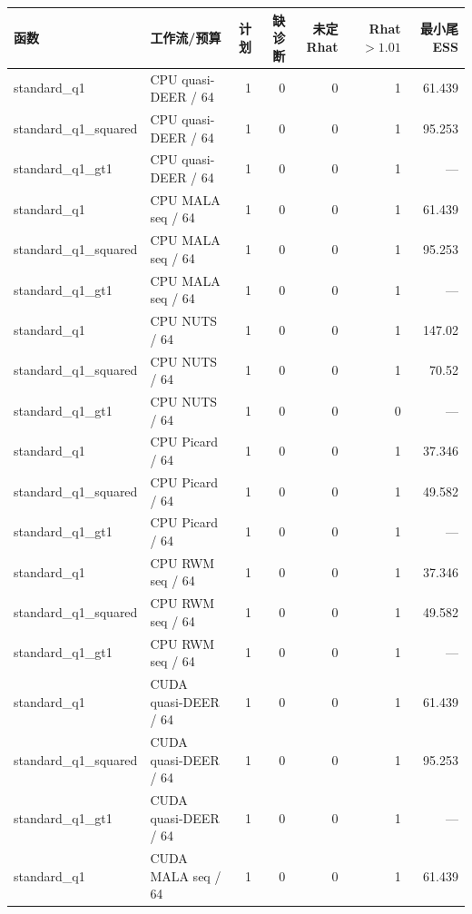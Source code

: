 \documentclass[UTF8,fontset=fandol,a4paper]{ctexart}
\begin{document}
\begingroup\footnotesize\begin{longtable}{P{28mm}P{40mm}rrrrr}
\toprule 函数 & 工作流/预算 & 计划 & 缺诊断 & 未定Rhat & Rhat$>1.01$ & 最小尾ESS \\ \midrule\endhead
standard\_\allowbreak{}q1 & CPU quasi-DEER / 64 & 1 & 0 & 0 & 1 & 61.439 \\
standard\_\allowbreak{}q1\_\allowbreak{}squared & CPU quasi-DEER / 64 & 1 & 0 & 0 & 1 & 95.253 \\
standard\_\allowbreak{}q1\_\allowbreak{}gt1 & CPU quasi-DEER / 64 & 1 & 0 & 0 & 1 & — \\
standard\_\allowbreak{}q1 & CPU MALA seq / 64 & 1 & 0 & 0 & 1 & 61.439 \\
standard\_\allowbreak{}q1\_\allowbreak{}squared & CPU MALA seq / 64 & 1 & 0 & 0 & 1 & 95.253 \\
standard\_\allowbreak{}q1\_\allowbreak{}gt1 & CPU MALA seq / 64 & 1 & 0 & 0 & 1 & — \\
standard\_\allowbreak{}q1 & CPU NUTS / 64 & 1 & 0 & 0 & 1 & 147.02 \\
standard\_\allowbreak{}q1\_\allowbreak{}squared & CPU NUTS / 64 & 1 & 0 & 0 & 1 & 70.52 \\
standard\_\allowbreak{}q1\_\allowbreak{}gt1 & CPU NUTS / 64 & 1 & 0 & 0 & 0 & — \\
standard\_\allowbreak{}q1 & CPU Picard / 64 & 1 & 0 & 0 & 1 & 37.346 \\
standard\_\allowbreak{}q1\_\allowbreak{}squared & CPU Picard / 64 & 1 & 0 & 0 & 1 & 49.582 \\
standard\_\allowbreak{}q1\_\allowbreak{}gt1 & CPU Picard / 64 & 1 & 0 & 0 & 1 & — \\
standard\_\allowbreak{}q1 & CPU RWM seq / 64 & 1 & 0 & 0 & 1 & 37.346 \\
standard\_\allowbreak{}q1\_\allowbreak{}squared & CPU RWM seq / 64 & 1 & 0 & 0 & 1 & 49.582 \\
standard\_\allowbreak{}q1\_\allowbreak{}gt1 & CPU RWM seq / 64 & 1 & 0 & 0 & 1 & — \\
standard\_\allowbreak{}q1 & CUDA quasi-DEER / 64 & 1 & 0 & 0 & 1 & 61.439 \\
standard\_\allowbreak{}q1\_\allowbreak{}squared & CUDA quasi-DEER / 64 & 1 & 0 & 0 & 1 & 95.253 \\
standard\_\allowbreak{}q1\_\allowbreak{}gt1 & CUDA quasi-DEER / 64 & 1 & 0 & 0 & 1 & — \\
standard\_\allowbreak{}q1 & CUDA MALA seq / 64 & 1 & 0 & 0 & 1 & 61.439 \\

\end{longtable}
\end{document}
